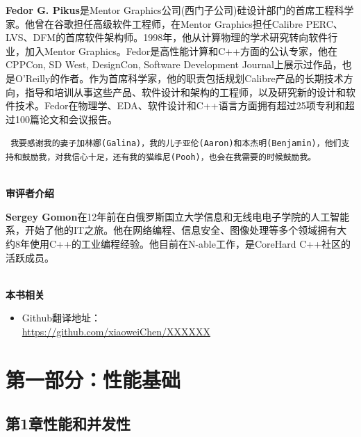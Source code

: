\documentclass[11pt,a4paper,UTF8]{book}
\begin{document}
\textbf{Fedor G. Pikus}是Mentor Graphics公司(西门子公司)硅设计部门的首席工程科学家。他曾在谷歌担任高级软件工程师，在Mentor Graphics担任Calibre PERC、LVS、DFM的首席软件架构师。1998年，他从计算物理的学术研究转向软件行业，加入Mentor Graphics。Fedor是高性能计算和C++方面的公认专家，他在CPPCon, SD West, DesignCon, Software Development Journal上展示过作品，也是O'Reilly的作者。作为首席科学家，他的职责包括规划Calibre产品的长期技术方向，指导和培训从事这些产品、软件设计和架构的工程师，以及研究新的设计和软件技术。Fedor在物理学、EDA、软件设计和C++语言方面拥有超过25项专利和超过100篇论文和会议报告。
\begin{center}
\tt
我要感谢我的妻子加林娜(Galina)，我的儿子亚伦(Aaron)和本杰明(Benjamin)，他们支持和鼓励我，对我信心十足，还有我的猫维尼(Pooh)，也会在我需要的时候鼓励我。
\end{center}

\thispagestyle{empty}
\hspace*{\fill} \\ %
\noindent\textbf{审评者介绍}

\textbf{Sergey Gomon}在12年前在白俄罗斯国立大学信息和无线电电子学院的人工智能系，开始了他的IT之旅。他在网络编程、信息安全、图像处理等多个领域拥有大约8年使用C++的工业编程经验。他目前在N-able工作，是CoreHard C++社区的活跃成员。


\hspace*{\fill} \\ %
\noindent\textbf{本书相关}
\begin{itemize}
\item Github翻译地址：\\\url{https://github.com/xiaoweiChen/XXXXXX}
\end{itemize}
\newpage

\pagestyle{empty}


\tableofcontents
\newpage


\color{white}
\section*{第一部分：性能基础}
\pagecolor{mygray}
\textbf{}
\newpage
\color{black}
\pagecolor{white}

\subsection*{ 第1章\hspace{0.5cm}性能和并发性}

\end{document}

